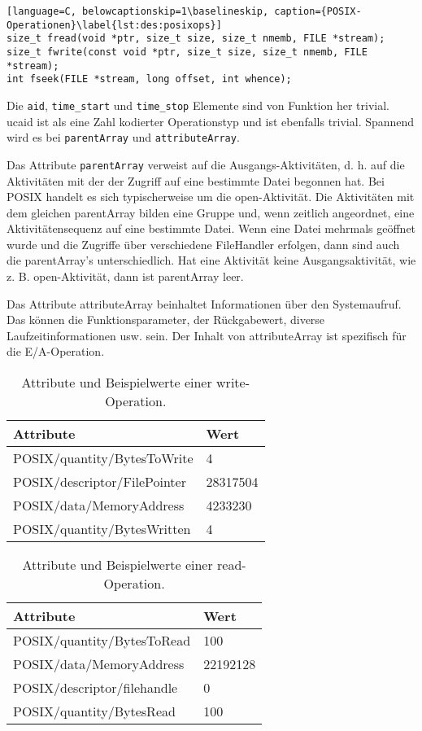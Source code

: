 \begin{lstlisting}[language=C, belowcaptionskip=1\baselineskip, caption={POSIX-Operationen}\label{lst:des:posixops}]
size_t fread(void *ptr, size_t size, size_t nmemb, FILE *stream);
size_t fwrite(const void *ptr, size_t size, size_t nmemb, FILE *stream);
int fseek(FILE *stream, long offset, int whence);
\end{lstlisting}

Die \lstinline{aid}, \lstinline{time_start} und \lstinline{time_stop} Elemente sind von Funktion her trivial. 
ucaid ist als eine Zahl kodierter Operationstyp und ist ebenfalls trivial. 
Spannend wird es bei \lstinline{parentArray} und \lstinline{attributeArray}.

Das Attribute \lstinline{parentArray} verweist auf die Ausgangs-Aktivitäten, d. h. auf die Aktivitäten mit der der Zugriff auf eine bestimmte Datei begonnen hat.
Bei POSIX handelt es sich typischerweise um die open-Aktivität.
Die Aktivitäten mit dem gleichen parentArray bilden eine Gruppe und, wenn zeitlich angeordnet, eine Aktivitätensequenz auf eine bestimmte Datei.
Wenn eine Datei mehrmals geöffnet wurde und die Zugriffe über verschiedene FileHandler erfolgen, dann sind auch die parentArray's unterschiedlich.
Hat eine Aktivität keine Ausgangsaktivität, wie z. B. open-Aktivität, dann ist parentArray leer.


Das Attribute attributeArray beinhaltet Informationen über den Systemaufruf.
Das können die Funktionsparameter, der Rückgabewert, diverse Laufzeitinformationen usw. sein.
Der Inhalt von attributeArray ist spezifisch für die E/A-Operation. 

\begin{table}[h]
	\centering
	\begin{tabular}{l | l}
		Attribute & Wert\\
		\hline
		POSIX/quantity/BytesToWrite & 4\\
		POSIX/descriptor/FilePointer & 28317504\\
		POSIX/data/MemoryAddress & 4233230\\
		POSIX/quantity/BytesWritten & 4
	\end{tabular}
	\caption{Attribute und Beispielwerte einer write-Operation.}
\end{table}

\begin{table}[h]
	\centering
	\begin{tabular}{l | l}
		Attribute & Wert\\
		\hline
		POSIX/quantity/BytesToRead & 100\\
		POSIX/data/MemoryAddress & 22192128\\
		POSIX/descriptor/filehandle & 0\\
		POSIX/quantity/BytesRead & 100\\
	\end{tabular}
	\caption{Attribute und Beispielwerte einer read-Operation.}
\end{table}

